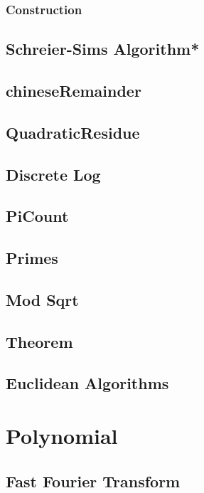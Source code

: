 \subsubsection{Construction}

\subsection{Schreier-Sims Algorithm*} %

\subsection{chineseRemainder}

\subsection{QuadraticResidue}

\subsection{Discrete Log}

\subsection{PiCount}

\subsection{Primes}

\subsection{Mod Sqrt}

\subsection{Theorem}

\subsection{Euclidean Algorithms}


\section{Polynomial}
\subsection{Fast Fourier Transform}

